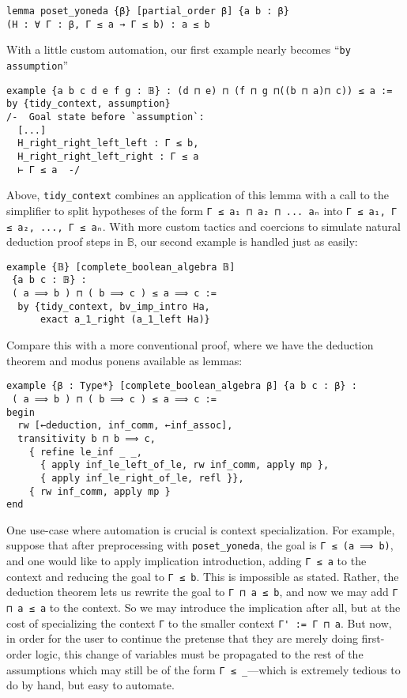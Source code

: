 \documentclass[sigplan,10pt,review, autoref,anonymous]{acmart}
\newcommand{\lil}{\lstinline}
\theoremstyle{definition}
\begin{document}
\label{poset-yoneda}
\begin{lstlisting}
lemma poset_yoneda {β} [partial_order β] {a b : β}
(H : ∀ Γ : β, Γ ≤ a → Γ ≤ b) : a ≤ b
\end{lstlisting}
With a little custom automation, our first example nearly becomes ``\lil{by assumption}''

\begin{lstlisting}
example {a b c d e f g : 𝔹} : (d ⊓ e) ⊓ (f ⊓ g ⊓((b ⊓ a)⊓ c)) ≤ a :=
by {tidy_context, assumption}
/-  Goal state before `assumption`:
  [...]
  H_right_right_left_left : Γ ≤ b,
  H_right_right_left_right : Γ ≤ a
  ⊢ Γ ≤ a  -/
\end{lstlisting}

Above, \lil{tidy_context} combines an application of this lemma with a call to the simplifier to split hypotheses of the form \lstinline{Γ ≤ a₁ ⊓ a₂ ⊓ ... aₙ} into \lstinline{Γ ≤ a₁, Γ ≤ a₂, ..., Γ ≤ aₙ}. With more custom tactics and coercions to simulate natural deduction proof steps in \(\mathbb{B}\), our second example is handled just as easily:
\begin{lstlisting}
example {𝔹} [complete_boolean_algebra 𝔹]
 {a b c : 𝔹} :
 ( a ⟹ b ) ⊓ ( b ⟹ c ) ≤ a ⟹ c :=
  by {tidy_context, bv_imp_intro Ha,
      exact a_1_right (a_1_left Ha)}
\end{lstlisting}

Compare this with a more conventional proof, where we have the deduction theorem and modus ponens available as lemmas:

\begin{lstlisting}
example {β : Type*} [complete_boolean_algebra β] {a b c : β} :
 ( a ⟹ b ) ⊓ ( b ⟹ c ) ≤ a ⟹ c :=
begin
  rw [←deduction, inf_comm, ←inf_assoc],
  transitivity b ⊓ b ⟹ c,
    { refine le_inf _ _,
      { apply inf_le_left_of_le, rw inf_comm, apply mp },
      { apply inf_le_right_of_le, refl }},
    { rw inf_comm, apply mp }
end
\end{lstlisting}

One use-case where automation is crucial is context specialization. For example, suppose that after preprocessing with \lstinline{poset_yoneda}, the goal is \lstinline{Γ ≤ (a ⟹ b)}, and one would like to apply implication introduction, adding \lstinline{Γ ≤ a} to the context and reducing the goal to \lstinline{Γ ≤ b}. This is impossible as stated. Rather, the deduction theorem lets us rewrite the goal to \lstinline{Γ ⊓ a ≤ b}, and now we may add \lstinline{Γ ⊓ a ≤ a} to the context. So we may introduce the implication after all, but at the cost of specializing the context \lstinline{Γ} to the smaller context \lstinline{Γ' := Γ ⊓ a}. But now, in order for the user to continue the pretense that they are merely doing first-order logic, this change of variables must be propagated to the rest of the assumptions which may still be of the form \lstinline{Γ ≤ _}---which is extremely tedious to do by hand, but easy to automate.
\end{document}
